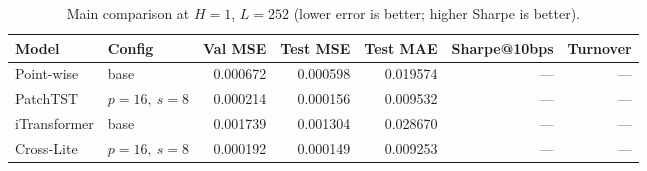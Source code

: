 \begin{table}
\caption{Main comparison at $H{=}1$, $L{=}252$ (lower error is better; higher Sharpe is better).}
\label{tab:main_h1}
\begin{tabular}{l l r r r r r}
\toprule
Model & Config & Val MSE & Test MSE & Test MAE & Sharpe@10bps & Turnover \\
\midrule
Point-wise & base & 0.000672 & 0.000598 & 0.019574 & — & — \\
PatchTST & $p=16,\ s=8$ & 0.000214 & 0.000156 & 0.009532 & — & — \\
iTransformer & base & 0.001739 & 0.001304 & 0.028670 & — & — \\
Cross-Lite & $p=16,\ s=8$ & 0.000192 & 0.000149 & 0.009253 & — & — \\
\bottomrule
\end{tabular}
\end{table}
